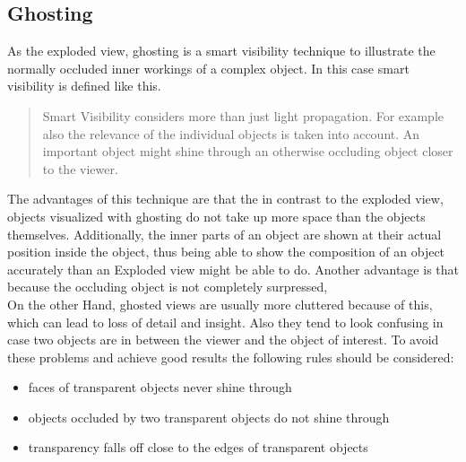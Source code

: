 \subsection{Ghosting}
As the exploded view, ghosting is a smart visibility technique to illustrate the normally occluded inner workings of a complex object. In this case smart visibility is defined like this.
\begin{quote}Smart Visibility considers more than just light propagation. For example also the relevance of the individual objects is taken into account. An important object might shine through an otherwise occluding object closer to the viewer. \cite{Viola-05-Smart}\end{quote}
The advantages of this technique are that the in contrast to the exploded view, objects visualized with ghosting do not take up more space than the objects themselves. Additionally, the inner parts of an object are shown at their actual position inside the object, thus being able to show the composition of an object accurately than an Exploded view might be able to do. Another advantage is that because the occluding object is not completely surpressed, \\
On the other Hand, ghosted views are usually more cluttered because of this, which can lead to loss of detail and insight. Also they tend to look confusing in case two objects are in between the viewer and the object of interest. To avoid these problems and achieve good results the following rules should be considered:\cite{Viola-05-Smart}
\begin{itemize}
\item faces of transparent objects never shine through
\item objects occluded by two transparent objects do not shine through
\item transparency falls off close to the edges of transparent objects
\end{itemize}
